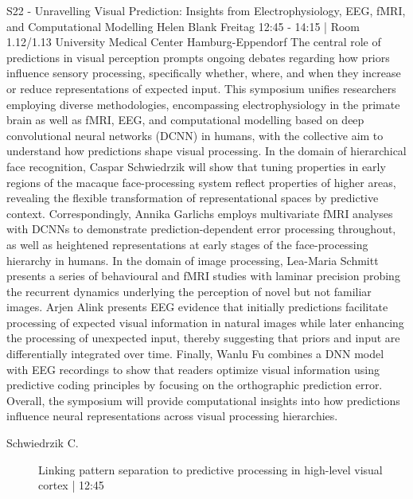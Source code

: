 
            \begin{symposium}
            {S22 - Unravelling Visual Prediction: Insights from Electrophysiology, EEG, fMRI, and Computational Modelling}
            {Helen Blank}
            {Freitag 12:45 - 14:15 | Room 1.12/1.13}
            {University Medical Center Hamburg-Eppendorf}
            The central role of predictions in visual perception prompts ongoing debates regarding how priors influence sensory processing, specifically whether, where, and when they increase or reduce representations of expected input. This symposium unifies researchers employing diverse methodologies, encompassing electrophysiology in the primate brain as well as fMRI, EEG, and computational modelling based on deep convolutional neural networks (DCNN) in humans, with the collective aim to understand how predictions shape visual processing.
In the domain of hierarchical face recognition, Caspar Schwiedrzik will show that tuning properties in early regions of the macaque face-processing system reflect properties of higher areas, revealing the flexible transformation of representational spaces by predictive context. Correspondingly, Annika Garlichs employs multivariate fMRI analyses with DCNNs to demonstrate prediction-dependent error processing throughout, as well as heightened representations at early stages of the face-processing hierarchy in humans. In the domain of image processing, Lea-Maria Schmitt presents a series of behavioural and fMRI studies with laminar precision probing the recurrent dynamics underlying the perception of novel but not familiar images. Arjen Alink presents EEG evidence that initially predictions facilitate processing of expected visual information in natural images while later enhancing the processing of unexpected input, thereby suggesting that priors and input are differentially integrated over time. Finally, Wanlu Fu combines a DNN model with EEG recordings to show that readers optimize visual information using predictive coding principles by focusing on the orthographic prediction error. Overall, the symposium will provide computational insights into how predictions influence neural representations across visual processing hierarchies.
            \begin{description}    
            
                \item [ Schwiedrzik C.] Linking pattern separation to predictive processing in high-level visual cortex  \textcolor{mygray}{ | 12:45}    
                

\end{description}
\end{symposium}
